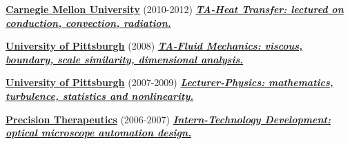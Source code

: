 \documentclass{article}
\newcommand{\employer}[3]{{ \textbf{#1} (#2) \underline{\textbf{\emph{#3}}}\\  }}
\newenvironment{achievements}{\begin{list}{$\bullet$}{\topsep 0pt \itemsep -2pt}}{\vspace*{4pt}\end{list}}
\begin{document}
\begin{itemize}
\begin{itemize}


    \end{itemize}


\employer{\href{https://www.cmu.edu/me/}{Carnegie Mellon University}}{2010-2012}{TA-Heat Transfer: lectured on conduction, convection, radiation.}

\employer{\href{http://www.engineering.pitt.edu/MEMS/}{University of Pittsburgh}}{2008}{TA-Fluid Mechanics: viscous, boundary, scale similarity, dimensional analysis.}

\employer{\href{http://www.physicsandastronomy.pitt.edu/}{University of Pittsburgh}}{2007-2009}{Lecturer-Physics: mathematics, turbulence, statistics and nonlinearity.}

\employer{\href{http://www.precisiontherapeutics.com/}{Precision Therapeutics}}{2006-2007}{Intern-Technology Development: optical microscope automation design.} 


\end{itemize}
\end{document}
